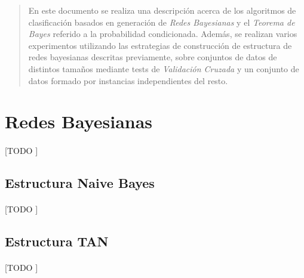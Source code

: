 \documentclass{article}
\begin{document}
	\maketitle %

	\thispagestyle{fancy} %



	\begin{abstract}
		\noindent En este documento se realiza una descripción acerca de los algoritmos de clasificación basados en generación de \emph{Redes Bayesianas} y el \emph{Teorema de Bayes} referido a la probabilidad condicionada. Además, se realizan varios experimentos utilizando las estrategias de construcción de estructura de redes bayesianas descritas previamente, sobre conjuntos de datos de distintos tamaños mediante tests de \emph{Validación Cruzada} y un conjunto de datos formado por instancias independientes del resto.
	\end{abstract}


	\section{Redes Bayesianas}
	\label{sec:bayes_network}

		\paragraph{}
		[TODO ]

		\subsection{Estructura Naive Bayes}
		\label{sec:structure_naive}

			\paragraph{}
			[TODO ]


		\subsection{Estructura TAN}
		\label{sec:structure_tan}

			\paragraph{}
			[TODO ]
\end{document}
